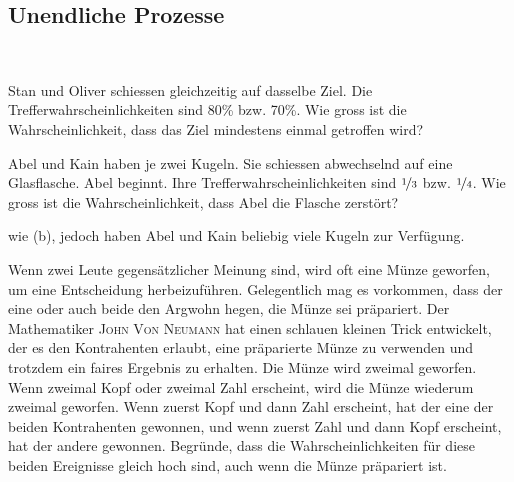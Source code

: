 \documentclass[%
11pt,%
twoside,%
titlepage,%
german,%
headsepline%
]{scrartcl}
\begin{document}
\subsection{Unendliche Prozesse}

\begin{ueb}
\ \\[-4ex]
\begin{enumeratea}
\item Stan und Oliver schiessen gleichzeitig auf dasselbe Ziel. Die Trefferwahrscheinlichkeiten sind 80\% bzw. 70\%. Wie gross ist die Wahrscheinlichkeit, dass das Ziel mindestens einmal getroffen wird?
\item Abel und Kain haben je zwei Kugeln. Sie schiessen abwechselnd auf eine Glasflasche. Abel beginnt. Ihre Trefferwahrscheinlichkeiten sind $\nicefrac{1}{3}$ bzw. $\nicefrac{1}{4}$. Wie gross ist die Wahrscheinlichkeit, dass Abel die Flasche zerstört?
\item wie (b), jedoch haben Abel und Kain beliebig viele Kugeln zur Verfügung.
\end{enumeratea}
\end{ueb}


Wenn zwei Leute gegensätzlicher Meinung sind, wird oft eine Münze geworfen, um eine Entscheidung herbeizuführen. Gelegentlich mag es vorkommen, dass der eine oder auch beide den Argwohn hegen, die Münze sei präpariert. Der Mathematiker \textsc{John Von Neumann} hat einen schlauen kleinen Trick entwickelt, der es den Kontrahenten erlaubt, eine präparierte Münze zu verwenden und trotzdem ein faires Ergebnis zu erhalten. Die Münze wird zweimal geworfen. Wenn zweimal Kopf oder zweimal Zahl erscheint, wird die Münze wiederum zweimal geworfen. Wenn zuerst Kopf und dann Zahl erscheint, hat der eine der beiden Kontrahenten gewonnen, und wenn zuerst Zahl und dann Kopf erscheint, hat der andere gewonnen. Begründe, dass die Wahrscheinlichkeiten für diese beiden Ereignisse gleich hoch sind, auch wenn die Münze präpariert ist.
\end{document}
